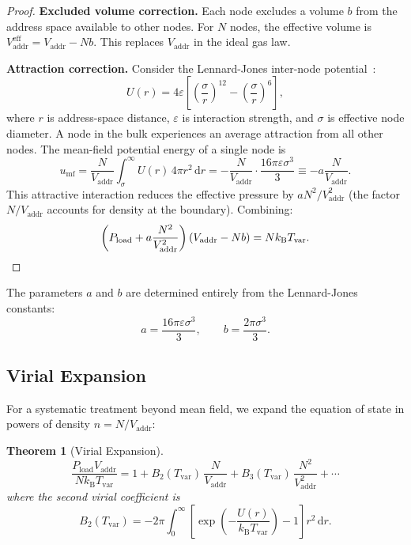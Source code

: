 \documentclass[11pt,twocolumn,a4paper]{article}
\newtheorem{theorem}{Theorem}[section]
\theoremstyle{definition}
\theoremstyle{remark}
\newcommand{\kB}{k_{\mathrm{B}}}
\newcommand{\Tvar}{T_{\mathrm{var}}}
\newcommand{\Pload}{P_{\mathrm{load}}}
\newcommand{\Vaddr}{V_{\mathrm{addr}}}
\newcommand{\dd}{\mathrm{d}}
\begin{document}
\begin{proof}
\textbf{Excluded volume correction.}
Each node excludes a volume $b$ from the address space available to other
nodes.  For $N$ nodes, the effective volume is $\Vaddr^{\mathrm{eff}}=\Vaddr-Nb$.
This replaces $\Vaddr$ in the ideal gas law.

\textbf{Attraction correction.}
Consider the Lennard-Jones inter-node potential~\cite{LennardJones1924}:
\begin{equation}\label{eq:lj}
  U(r) = 4\varepsilon\left[\left(\frac{\sigma}{r}\right)^{12}
  -\left(\frac{\sigma}{r}\right)^{6}\right],
\end{equation}
where $r$ is address-space distance, $\varepsilon$ is interaction strength,
and $\sigma$ is effective node diameter.  A node in the bulk experiences
an average attraction from all other nodes.  The mean-field potential
energy of a single node is
\[
  u_{\mathrm{mf}} = \frac{N}{\Vaddr}\int_\sigma^{\infty}U(r)\,4\pi r^2
  \,\dd r = -\frac{N}{\Vaddr}\cdot\frac{16\pi\varepsilon\sigma^3}{3}
  \equiv -a\frac{N}{\Vaddr}.
\]
This attractive interaction reduces the effective pressure by
$a N^2/\Vaddr^2$ (the factor $N/\Vaddr$ accounts for density at the
boundary).  Combining:
\[
  \left(\Pload+a\frac{N^2}{\Vaddr^2}\right)(\Vaddr-Nb)=N\kB\Tvar.
  \qedhere
\]
\end{proof}

The parameters $a$ and $b$ are determined entirely from the Lennard-Jones
constants:
\begin{equation}\label{eq:ab_lj}
  a = \frac{16\pi\varepsilon\sigma^3}{3},\qquad
  b = \frac{2\pi\sigma^3}{3}.
\end{equation}

\subsection{Virial Expansion}\label{sec:virial}

For a systematic treatment beyond mean field, we expand the equation of
state in powers of density $n=N/\Vaddr$:

\begin{theorem}[Virial Expansion]\label{thm:virial}
\begin{equation}\label{eq:virial}
  \frac{\Pload\Vaddr}{N\kB\Tvar} = 1 + B_2(\Tvar)\,\frac{N}{\Vaddr}
  + B_3(\Tvar)\,\frac{N^2}{\Vaddr^2} + \cdots
\end{equation}
where the second virial coefficient is
\begin{equation}\label{eq:b2}
  B_2(\Tvar) = -2\pi\int_0^{\infty}
  \left[\exp\!\left(-\frac{U(r)}{\kB\Tvar}\right)-1\right]r^2\,\dd r.
\end{equation}
\end{theorem}
\end{document}
